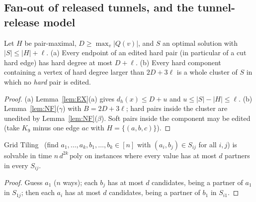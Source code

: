 \subsection{Fan-out of released tunnels, and the tunnel-release model}
\begin{lemma}\label{lem:tfan}
Let $H$ be pair-maximal, $D\ge\max_v|Q(v)|$, and $S$ an optimal solution with $|S|\le|H|+\ell$. (a) Every endpoint of an edited hard pair (in particular of a cut hard edge) has hard degree at most $D+\ell$. (b) Every hard component containing a vertex of hard degree larger than $2D+3\ell$ is a whole cluster of $S$ in which no \emph{hard} pair is edited.
\end{lemma}
\begin{proof}
(a) Lemma~\ref{lem:EX}(a) gives $d_h(x)\le D+u$ and $u\le|S|-|H|\le\ell$. (b) Lemma~\ref{lem:NF}($\gamma$) with $B=2D+3\ell$; hard pairs inside the cluster are unedited by Lemma~\ref{lem:NF}($\beta$). Soft pairs inside the component may be edited (take $K_9$ minus one edge $ac$ with $H=\{(a,b,c)\}$).
\end{proof}

\begin{proposition}\label{prop:tGT}
Grid Tiling~\cite{Cygan15} (find $a_1,\dots,a_k,b_1,\dots,b_k\in[n]$ with $(a_i,b_j)\in S_{ij}$ for all $i,j$) is solvable in time $n\,d^{2k}\,\mathrm{poly}$ on instances where every value has at most $d$ partners in every $S_{ij}$.
\end{proposition}
\begin{proof}
Guess $a_1$ ($n$ ways); each $b_j$ has at most $d$ candidates, being a partner of $a_1$ in $S_{1j}$; then each $a_i$ has at most $d$ candidates, being a partner of $b_1$ in $S_{i1}$.
\end{proof}

